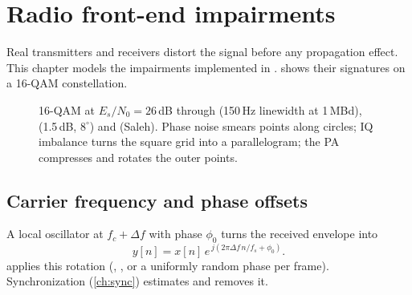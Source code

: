 \chapter{Radio front-end impairments}\label{ch:impairments}

Real transmitters and receivers distort the signal before any propagation effect. This chapter
models the impairments implemented in . 
shows their signatures on a 16-QAM constellation.

\begin{figure}[htbp]
\centering
{}
\caption{16-QAM at $E_s/N_0=26$\,dB through  (150\,Hz linewidth at
1\,MBd),  (1.5\,dB, $8^\circ$) and  (Saleh). Phase
noise smears points along circles; IQ imbalance turns the square grid into a parallelogram;
the PA compresses and rotates the outer points.}
\label{fig:impair-const}
\end{figure}

\section{Carrier frequency and phase offsets}
A local oscillator at $f_c+\Delta f$ with phase $\phi_0$ turns the received envelope into
\begin{equation}
  y[n]=x[n]\,e^{\,j(2\pi\Delta f\,n/f_s+\phi_0)} .
\end{equation}
 applies this rotation (, , or a uniformly random
phase per frame). Synchronization (\cref{ch:sync}) estimates and removes it.

